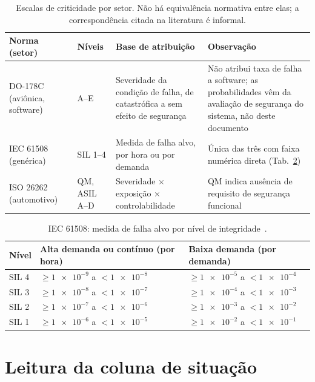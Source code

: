 \documentclass[10pt,a4paper,landscape]{article}
\begin{document}
\begin{table}[H]
\centering
\caption{Escalas de criticidade por setor. Não há equivalência normativa entre elas; a correspondência citada na literatura é informal.}
\label{tab:escalas}
\footnotesize
\renewcommand{\arraystretch}{1.2}
\begin{tabularx}{\textwidth}{@{}Y{0.72}Y{0.55}Y{1.25}Y{1.48}@{}}
\toprule
\textbf{Norma (setor)} & \textbf{Níveis} & \textbf{Base de atribuição} & \textbf{Observação} \\
\midrule
DO-178C (aviônica, software)~\cite{do178c} & A--E & Severidade da condição de falha, de catastrófica a sem efeito de segurança & Não atribui taxa de falha a software; as probabilidades vêm da avaliação de segurança do sistema, não deste documento \\
IEC 61508 (genérica)~\cite{iec61508} & SIL 1--4 & Medida de falha alvo, por hora ou por demanda & Única das três com faixa numérica direta (Tab.~\ref{tab:sil}) \\
ISO 26262 (automotivo)~\cite{iso26262} & QM, ASIL A--D & Severidade $\times$ exposição $\times$ controlabilidade & QM indica ausência de requisito de segurança funcional \\
\bottomrule
\end{tabularx}
\end{table}

\begin{table}[H]
\centering
\caption{IEC 61508: medida de falha alvo por nível de integridade~\cite{iec61508}.}
\label{tab:sil}
\footnotesize
\renewcommand{\arraystretch}{1.2}
\begin{tabular}{@{}lll@{}}
\toprule
\textbf{Nível} & \textbf{Alta demanda ou contínuo (por hora)} & \textbf{Baixa demanda (por demanda)} \\
\midrule
SIL 4 & $\geq \num{1e-9}$ a $< \num{1e-8}$ & $\geq \num{1e-5}$ a $< \num{1e-4}$ \\
SIL 3 & $\geq \num{1e-8}$ a $< \num{1e-7}$ & $\geq \num{1e-4}$ a $< \num{1e-3}$ \\
SIL 2 & $\geq \num{1e-7}$ a $< \num{1e-6}$ & $\geq \num{1e-3}$ a $< \num{1e-2}$ \\
SIL 1 & $\geq \num{1e-6}$ a $< \num{1e-5}$ & $\geq \num{1e-2}$ a $< \num{1e-1}$ \\
\bottomrule
\end{tabular}
\end{table}

\section{Leitura da coluna de situação}
\end{document}

